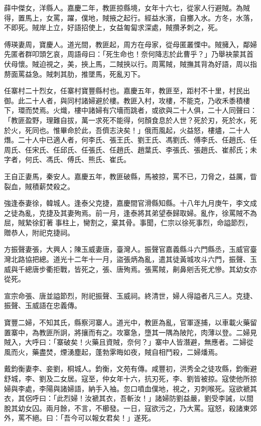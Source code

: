 \begin{pinyinscope}
薛中傑女，洋縣人。嘉慶二年，教匪掠縣境，女年十六七，從家人行避賊。為賊得，置馬上，女罵，躍，僕地，賊掖之起行。經益水濱，自擲入水。方冬，水落，不即死。賊岸上立，好語招使上，女益匍匐求深處，賊攢矛刺之，死。

傅瑛妻周，寶慶人。道光間，教匪起，周方在母家，從母匿叢慄中。賊擁入，鄰婦先匿者群叩頭乞哀，周語母曰：「死生命也！奈何降志於此曹乎？」乃舉袂蒙其首伏母懷。賊迫視之，美，挾上馬，二賊挾以行。周罵賊，賊撫其背為好語，周以指剺面罵益急。賊刺其肋，推墜馬，死亂刃下。

任寨村二十烈女，任寨村寶豐縣村也。嘉慶五年，教匪至，距村不十里，村民出御。此二十人者，與同村諸婦避於樓。教匪入村，攻樓，不能克，乃收禾黍積樓下，環而焚焉。火熾，樓中諸婦有穴墻而跳者，或欲與二十人俱，二十人同聲曰：「教匪盈野，理難自拔，萬一求死不能得，何顏食息於人世？死於刃，死於水，死於火，死同也。惟畢命於此，吾儕志決矣！」俄而風起，火益怒，樓燼，二十人熸。二十人中已適人者，何李氏、張王氏、劉王氏、馮劉氏、傅李氏、任趙氏、任周氏、任宋氏、任邱氏、任張氏、任趙氏、趙葉氏、李張氏、張趙氏、崔郝氏；未字者，何氏、馮氏、傅氏、熊氏、崔氏。

王自正妻馬，秦安人。嘉慶五年，教匪破縣，馬被掠，罵不已，刀脅之，益厲，眥裂血，賊積薪焚殺之。

強逢泰妻徐，韓城人。逢泰父克捷，嘉慶間官滑縣知縣。十八年九月庚午，李文成之徒為亂，克捷及其妻殉焉。前一月，逢泰將其弟望泰歸取婦。亂作，徐罵賊不為屈，賊縶徐釘著事柱上，臠割之，棄其骨。事聞，仁宗以徐死事烈，命謚節烈，贈恭人，附祀克捷祠。

方振聲妻張，大興人；陳玉威妻唐，臺灣人。振聲官嘉義縣斗六門縣丞，玉威官臺灣北路協把總。道光十二年十一月，盜張炳為亂，遣其徒黃城攻斗六門，振聲、玉威與千總唐步衢拒戰，皆死之，張、唐殉焉。張罵賊，劓鼻剜舌死尤慘。其幼女亦從死。

宣宗命張、唐並謚節烈，附祀振聲、玉威祠。終清世，婦人得謚者凡三人。克捷、振聲、玉威語在忠義傳。

寶豐二婦，不知其氏，縣察河寨人。道光中，教匪為亂，官軍逐捕，以車載火藥留置寨中，為教匪所詗，將攘而有之。攻寨急，墮其一隅為陂陀，肉薄以登。二婦見賊入，大呼曰：「寨破矣！火藥且資賊，奈何？」寨中人皆潛避，無應者。二婦從風而火，藥盡焚，煙湧塵起，蓬勃雺晦如夜，賊自相鬥殺，二婦燔焉。

戴鈞衡妻李、妾劉，桐城人。鈞衡，文苑有傳。咸豐初，洪秀全之徒攻縣，鈞衡避舒城，李、劉及二女居。寇至，仲女年十六，抗刃死，李、劉皆被掠。寇使他所掠婦與李處，李陽與諸婦語，納手入袖。忽口噴血僕地，視之，刃刺喉死。寇欲褫其衣，其侶呼曰：「此烈婦！汝褫其衣，吾斬汝！」諸婦防劉益嚴，劉受李誡，以間脫其幼女囚。兩月餘，不言，不櫛發。一日，寇欲污之，乃大罵。寇怒，殺諸東郊外，罵不絕。曰：「吾今可以報女君矣！」遂死。


\end{pinyinscope}
